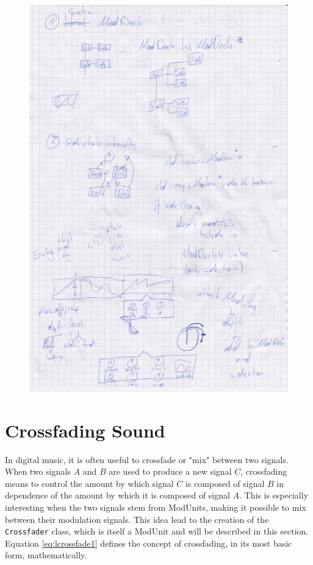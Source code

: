 \documentclass[12pt,twoside]{report}
\begin{document}
\begin{figure}[p!]
  \includegraphics[scale=0.8]{img/scsketch}
  \caption{}
  \label{fig:scsketch}
\end{figure}

\pagebreak

\chapter{Crossfading Sound}

In digital music, it is often useful to crossfade or "mix" between two signals\footnotemark{}. When two signals $A$ and $B$ are used to produce a new signal $C$, crossfading means to control the amount by which signal $C$ is composed of signal $B$ in dependence of the amount by which it is composed of signal $A$. This is especially interesting when the two signals stem from ModUnits, making it possible to mix between their modulation signals. This idea lead to the creation of the \texttt{Crossfader} class, which is itself a ModUnit and will be described in this section. Equation \ref{eq:lcrossfade1} defines the concept of crossfading, in its most basic form, mathematically.
\end{document}
